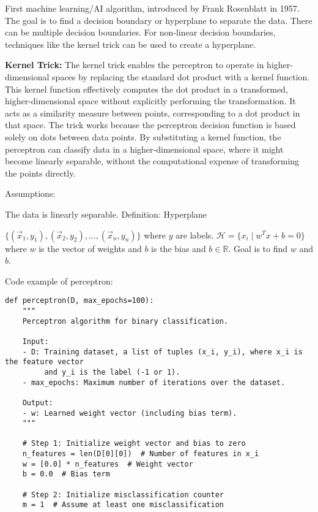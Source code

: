 \begin{outline}
    \1 First machine learning/AI algorithm, introduced by Frank Rosenblatt in 1957\cite{rosenblatt1958perceptron}.
    \1 The goal is to find a decision boundary or hyperplane to separate the data. There can be multiple decision boundaries.
    \1 For non-linear decision boundaries, techniques like the kernel trick can be used to create a hyperplane.

    \1\textbf{Kernel Trick:} The kernel trick enables the perceptron to operate in higher-dimensional spaces by replacing the standard dot product with 
    a kernel function. This kernel function effectively computes the dot product in a transformed, higher-dimensional space without 
    explicitly performing the transformation. It acts as a similarity measure between points, corresponding to a dot product in that 
    space. The trick works because the perceptron decision function is based solely on dots between data points. By substituting a kernel 
    function, the perceptron can classify data in a higher-dimensional space, where it might become linearly separable, without the computational 
    expense of transforming the points directly.
 
    \1 Assumptions:
    
        \2 The data is linearly separable.
    \1 Definition: Hyperplane
    
        \2 $\{(\vec{x}_1,y_1),(\vec{x}_2,y_2),...,(\vec{x}_n,y_n)\}$ where $y$ are labels.
        \2 $\mathcal{H}=\{x_i\mid w^Tx+b=0\}$ where $w$ is the vector of weights and $b$ is the bias and $b\in\mathbb{R}$.
        \2 Goal is to find $w$ and $b$.

    \1 Code example of perceptron:
    \begin{verbatim}
def perceptron(D, max_epochs=100):
    """
    Perceptron algorithm for binary classification.

    Input:
    - D: Training dataset, a list of tuples (x_i, y_i), where x_i is the feature vector 
         and y_i is the label (-1 or 1).
    - max_epochs: Maximum number of iterations over the dataset.

    Output:
    - w: Learned weight vector (including bias term).
    """
    
    # Step 1: Initialize weight vector and bias to zero
    n_features = len(D[0][0])  # Number of features in x_i
    w = [0.0] * n_features  # Weight vector
    b = 0.0  # Bias term
    
    # Step 2: Initialize misclassification counter
    m = 1  # Assume at least one misclassification
    

\end{verbatim}
\end{outline}

